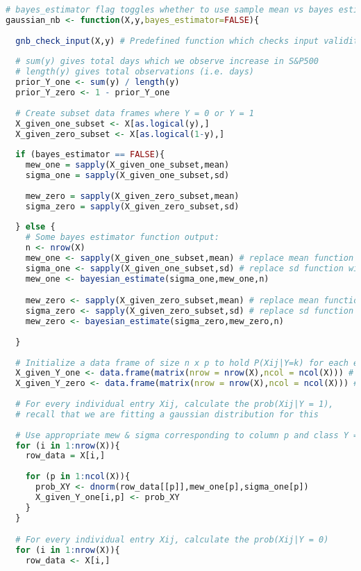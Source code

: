 \documentclass{article}
\begin{document}
\begin{lstlisting}[language=R]
# bayes_estimator flag toggles whether to use sample mean vs bayes estimator
gaussian_nb <- function(X,y,bayes_estimator=FALSE){
  
  gnb_check_input(X,y) # Predefined function which checks input validity
  
  # sum(y) gives total days which we observe increase in S&P500
  # length(y) gives total observations (i.e. days)
  prior_Y_one <- sum(y) / length(y)
  prior_Y_zero <- 1 - prior_Y_one 
  
  # Create subset data frames where Y = 0 or Y = 1 
  X_given_one_subset <- X[as.logical(y),]
  X_given_zero_subset <- X[as.logical(1-y),]
    
  if (bayes_estimator == FALSE){
    mew_one = sapply(X_given_one_subset,mean)
    sigma_one = sapply(X_given_one_subset,sd)
    
    mew_zero = sapply(X_given_zero_subset,mean)
    sigma_zero = sapply(X_given_zero_subset,sd)
    
  } else {
    # Some bayes estimator function output:
    n <- nrow(X)
    mew_one <- sapply(X_given_one_subset,mean) # replace mean function with something else!
    sigma_one <- sapply(X_given_one_subset,sd) # replace sd function with something else!
    mew_one <- bayesian_estimate(sigma_one,mew_one,n)

    mew_zero <- sapply(X_given_zero_subset,mean) # replace mean function with something else!
    sigma_zero <- sapply(X_given_zero_subset,sd) # replace sd function with something else!
    mew_zero <- bayesian_estimate(sigma_zero,mew_zero,n)
    
  }   
  
  # Initialize a data frame of size n x p to hold P(Xij|Y=k) for each entry of matrix X
  X_given_Y_one <- data.frame(matrix(nrow = nrow(X),ncol = ncol(X))) # Y = 1
  X_given_Y_zero <- data.frame(matrix(nrow = nrow(X),ncol = ncol(X))) # Y = 0 
  
  # For every individual entry Xij, calculate the prob(Xij|Y = 1), 
  # recall that we are fitting a gaussian distribution for this
  
  # Use appropriate mew & sigma corresponding to column p and class Y = k
  for (i in 1:nrow(X)){
    row_data = X[i,] 
    
    for (p in 1:ncol(X)){
      prob_XY <- dnorm(row_data[[p]],mew_one[p],sigma_one[p])
      X_given_Y_one[i,p] <- prob_XY
    }    
  }

  # For every individual entry Xij, calculate the prob(Xij|Y = 0)  
  for (i in 1:nrow(X)){
    row_data <- X[i,] 
    

\end{lstlisting}
\end{document}

